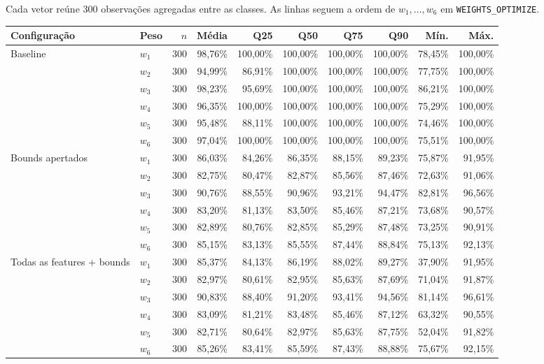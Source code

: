 \documentclass[11pt,a4paper]{article}
\begin{document}
Cada vetor reúne 300 observações agregadas entre as classes. As linhas seguem
a ordem de $w_1,\ldots,w_6$ em \texttt{WEIGHTS\_OPTIMIZE}.

\begin{center}\small
\begin{tabular}{llrrrrrrrr}
\toprule
Configuração & Peso & $n$ & Média & Q25 & Q50 & Q75 & Q90 & Mín. & Máx. \\
\midrule
Baseline & $w_1$ & 300 & 98,76\% & 100,00\% & 100,00\% & 100,00\% & 100,00\% & 78,45\% & 100,00\% \\
 & $w_2$ & 300 & 94,99\% & 86,91\% & 100,00\% & 100,00\% & 100,00\% & 77,75\% & 100,00\% \\
 & $w_3$ & 300 & 98,23\% & 95,69\% & 100,00\% & 100,00\% & 100,00\% & 86,21\% & 100,00\% \\
 & $w_4$ & 300 & 96,35\% & 100,00\% & 100,00\% & 100,00\% & 100,00\% & 75,29\% & 100,00\% \\
 & $w_5$ & 300 & 95,48\% & 88,11\% & 100,00\% & 100,00\% & 100,00\% & 74,46\% & 100,00\% \\
 & $w_6$ & 300 & 97,04\% & 100,00\% & 100,00\% & 100,00\% & 100,00\% & 75,51\% & 100,00\% \\
\midrule
Bounds apertados & $w_1$ & 300 & 86,03\% & 84,26\% & 86,35\% & 88,15\% & 89,23\% & 75,87\% & 91,95\% \\
 & $w_2$ & 300 & 82,75\% & 80,47\% & 82,87\% & 85,56\% & 87,46\% & 72,63\% & 91,06\% \\
 & $w_3$ & 300 & 90,76\% & 88,55\% & 90,96\% & 93,21\% & 94,47\% & 82,81\% & 96,56\% \\
 & $w_4$ & 300 & 83,20\% & 81,13\% & 83,50\% & 85,46\% & 87,21\% & 73,68\% & 90,57\% \\
 & $w_5$ & 300 & 82,89\% & 80,76\% & 82,85\% & 85,29\% & 87,48\% & 73,25\% & 90,91\% \\
 & $w_6$ & 300 & 85,15\% & 83,13\% & 85,55\% & 87,44\% & 88,84\% & 75,13\% & 92,13\% \\
\midrule
Todas as features + bounds & $w_1$ & 300 & 85,37\% & 84,13\% & 86,19\% & 88,02\% & 89,27\% & 37,90\% & 91,95\% \\
 & $w_2$ & 300 & 82,97\% & 80,61\% & 82,95\% & 85,63\% & 87,69\% & 71,04\% & 91,87\% \\
 & $w_3$ & 300 & 90,83\% & 88,40\% & 91,20\% & 93,41\% & 94,56\% & 81,14\% & 96,61\% \\
 & $w_4$ & 300 & 83,09\% & 81,21\% & 83,48\% & 85,46\% & 87,12\% & 63,32\% & 90,55\% \\
 & $w_5$ & 300 & 82,71\% & 80,64\% & 82,97\% & 85,63\% & 87,75\% & 52,04\% & 91,82\% \\
 & $w_6$ & 300 & 85,26\% & 83,41\% & 85,59\% & 87,43\% & 88,88\% & 75,67\% & 92,15\% \\
\bottomrule
\end{tabular}
\end{center}
\end{document}
